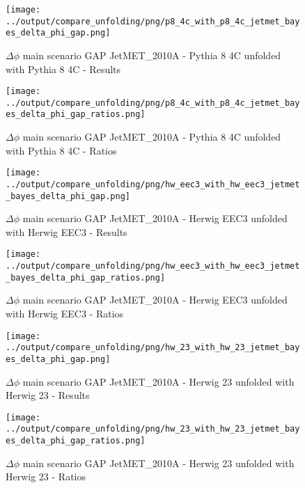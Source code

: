 \documentclass[11pt]{book}
\begin{document}
\begin{figure}[ht]
\centering
\texttt{[image: ../output/compare\_unfolding/png/p8\_4c\_with\_p8\_4c\_jetmet\_bayes\_delta\_phi\_gap.png]}
\caption{$\Delta\phi$ main scenario GAP JetMET\_2010A - Pythia 8 4C unfolded with Pythia 8 4C - Results}
\label{p8_p8_jetmet_bayes_delta_phi_gap_a}
\end{figure}

\begin{figure}[ht]
\centering
\texttt{[image: ../output/compare\_unfolding/png/p8\_4c\_with\_p8\_4c\_jetmet\_bayes\_delta\_phi\_gap\_ratios.png]}
\caption{$\Delta\phi$ main scenario GAP JetMET\_2010A - Pythia 8 4C unfolded with Pythia 8 4C - Ratios}
\label{p8_p8_jetmet_bayes_delta_phi_gap_b}
\end{figure}

\begin{figure}[ht]
\centering
\texttt{[image: ../output/compare\_unfolding/png/hw\_eec3\_with\_hw\_eec3\_jetmet\_bayes\_delta\_phi\_gap.png]}
\caption{$\Delta\phi$ main scenario GAP JetMET\_2010A - Herwig EEC3 unfolded with Herwig EEC3 - Results}
\label{hw_eec3_hw_eec3_jetmet_bayes_delta_phi_gap_a}
\end{figure}

\begin{figure}[ht]
\centering
\texttt{[image: ../output/compare\_unfolding/png/hw\_eec3\_with\_hw\_eec3\_jetmet\_bayes\_delta\_phi\_gap\_ratios.png]}
\caption{$\Delta\phi$ main scenario GAP JetMET\_2010A - Herwig EEC3 unfolded with Herwig EEC3 - Ratios}
\label{hw_eec3_hw_eec3_jetmet_bayes_delta_phi_gap_b}
\end{figure}

\begin{figure}[ht]
\centering
\texttt{[image: ../output/compare\_unfolding/png/hw\_23\_with\_hw\_23\_jetmet\_bayes\_delta\_phi\_gap.png]}
\caption{$\Delta\phi$ main scenario GAP JetMET\_2010A - Herwig 23 unfolded with Herwig 23 - Results}
\label{hw_23_hw_23_jetmet_bayes_delta_phi_gap_a}
\end{figure}

\begin{figure}[ht]
\centering
\texttt{[image: ../output/compare\_unfolding/png/hw\_23\_with\_hw\_23\_jetmet\_bayes\_delta\_phi\_gap\_ratios.png]}
\caption{$\Delta\phi$ main scenario GAP JetMET\_2010A - Herwig 23 unfolded with Herwig 23 - Ratios}
\label{hw_23_hw_23_jetmet_bayes_delta_phi_gap_b}
\end{figure}
\end{document}
